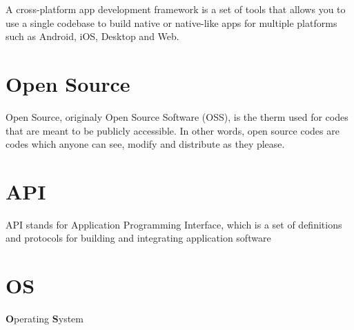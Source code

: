 
A cross-platform app development framework is a set of tools that allows you to use a single codebase to build native or native-like apps for multiple platforms such as Android, iOS, Desktop and Web.

\section{Open Source }
\label{sub:open_source}

Open Source, originaly Open Source Software (OSS), is the therm used for codes that are meant to be publicly accessible. In other words, open source codes are codes which anyone can see, modify and distribute as they please. %


\section{API}
\label{sub:api}

API stands for Application Programming Interface, which is a set of definitions and protocols for building and integrating application software


\section{OS}
\label{os}

\textbf{O}perating \textbf{S}ystem